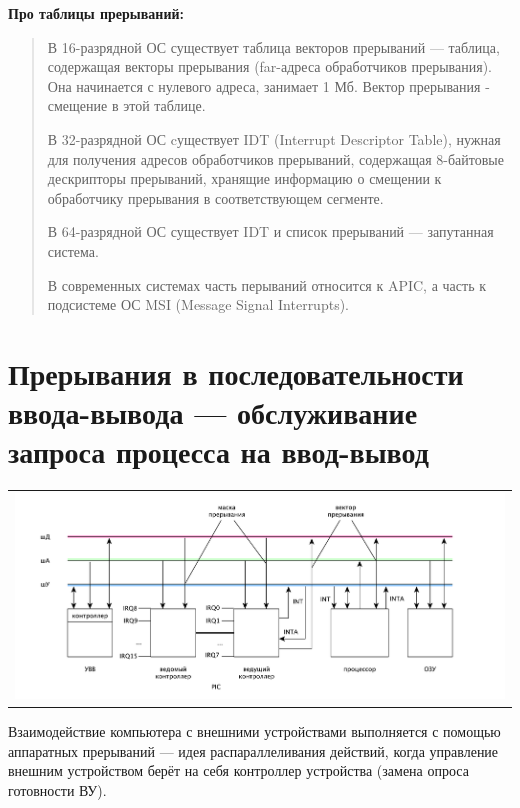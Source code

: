 \textbf{Про таблицы прерываний:}

\begin{quote}	
	В 16-разрядной ОС существует таблица векторов прерываний --- таблица, содержащая векторы прерывания (far-адреса обработчиков прерывания). Она начинается с нулевого адреса, занимает 1 Мб. Вектор прерывания - смещение в этой таблице.
	
	В 32-разрядной ОС cуществует IDT (Interrupt Descriptor Table), нужная для получения адресов обработчиков прерываний, содержащая 8-байтовые дескрипторы прерываний, хранящие информацию о смещении к обработчику прерывания в соответствующем сегменте.
	
	В 64-разрядной ОС существует IDT и список прерываний --- запутанная система.
	
	В современных системах часть перываний относится к APIC, а часть к подсистеме ОС MSI (Message Signal Interrupts).
\end{quote}

\newpage

\section{Прерывания в последовательности ввода-вывода --- обслуживание запроса процесса на ввод-вывод}

\begin{table}[h!]
  \centering
  \begin{tabular}{p{1\linewidth}}
    \centering
    \includegraphics[width=0.9\linewidth]{./images/buses.pdf}
  \end{tabular}
\end{table}

Взаимодействие компьютера с внешними устройствами выполняется с помощью аппаратных прерываний --- идея распараллеливания действий, когда управление внешним устройством берёт на себя контроллер устройства (замена опроса готовности ВУ).

